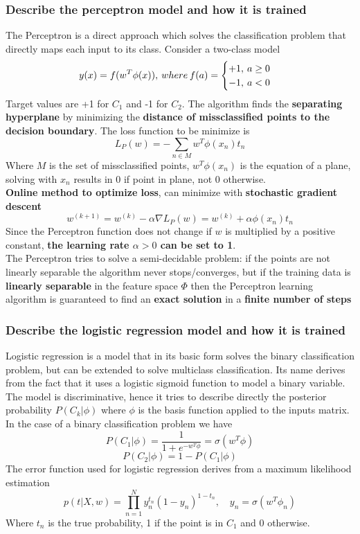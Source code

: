 \subsubsection{Describe the perceptron model and how it is trained}
    The Perceptron is a direct approach which solves the classification problem that directly maps each input to its class. Consider a two-class model
    $$
    y(x)=f(w^T\phi(x)),\hspace{0.2em}where\hspace{0.2em}f(a)=
    \begin{cases}
        +1,\hspace{0.2em}a\geq 0\\
        -1,\hspace{0.2em}a<0
    \end{cases}
    $$
    Target values are +1 for $C_1$ and -1 for $C_2$. The algorithm finds the \textbf{separating hyperplane} by minimizing the \textbf{distance of missclassified points to the decision boundary}. The loss function to be minimize is
    $$L_P(w)=-\sum_{n\in M}w^T\phi(x_n)t_n$$
    Where $M$ is the set of missclassified points, $w^T\phi(x_n)$ is the equation of a plane, solving with $x_n$ results in 0 if point in plane, not 0 otherwise.\\
    \textbf{Online method to optimize loss}, can minimize with \textbf{stochastic gradient descent}
    $$w^{(k+1)}=w^{(k)}-\alpha\nabla L_P(w)=w^{(k)}+\alpha\phi(x_n)t_n$$
    Since the Perceptron function does not change if $w$ is multiplied by a positive constant, \textbf{the learning rate $\alpha>0$ can be set to 1}.\\
    The Perceptron tries to solve a semi-decidable problem: if the points are not linearly separable the algorithm never stops/converges, but if the training data is \textbf{linearly separable} in the feature space $\Phi$ then the Perceptron learning algorithm is guaranteed to find an \textbf{exact solution} in a \textbf{finite number of steps}

\subsubsection{Describe the logistic regression model and how it is trained}
    Logistic regression is a model that in its basic form solves the binary classification problem, but can be extended to solve multiclass classification. Its name derives from the fact that it uses a logistic sigmoid function to model a binary variable.\\
    The model is discriminative, hence it tries to describe directly the posterior probability $P(C_k|\phi)$ where $\phi$ is the basis function applied to the inputs matrix.\\
    In the case of a binary classification problem we have 
    $$
    P(C_1 | \phi) = \frac{1}{1+e^{-w^T \phi}}=\sigma(w^T\phi)
    $$
    $$
    P(C_2|\phi) =1 - P(C_1|\phi)
    $$
    The error function used for logistic regression derives from a maximum likelihood estimation
    $$p(t|X,w)=\prod_{n=1}^Ny_n^{t_n}(1-y_n)^{1-t_n},\hspace{1em}y_n=\sigma(w^T\phi_n)$$
    Where $t_n$ is the true probability, 1 if the point is in $C_1$ and 0 otherwise.

